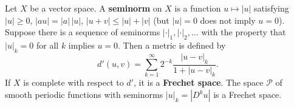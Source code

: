 Let $X$ be a vector space. A \textbf{seminorm} on $X$ is a function $u \mapsto |u|$ satisfying $|u| \geq 0$, $|au| = |a|\,|u|$, $|u+v| \leq |u| + |v|$ (but $|u| = 0$ does not imply $u = 0$). Suppose there is a sequence of seminorms $|\cdot|_1, |\cdot|_2, \ldots$ with the property that $|u|_k = 0$ for all $k$ implies $u = 0$. Then a metric is defined by
$$d'(u, v) = \sum_{k=1}^{\infty} 2^{-k} \frac{|u-v|_k}{1 + |u-v|_k}.$$
If $X$ is complete with respect to $d'$, it is a \textbf{Frechet space}. The space $\mathcal{P}$ of smooth periodic functions with seminorms $|u|_k = |D^k u|$ is a Frechet space.
